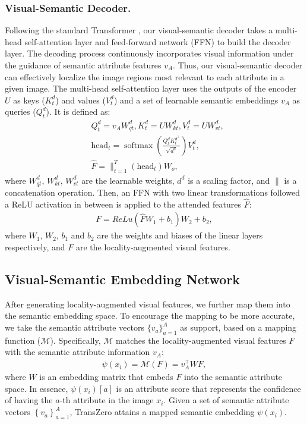 \documentclass[letterpaper]{article} %
\begin{document}
	\subsubsection{Visual-Semantic Decoder.}\label{sec3.2.2}
	Following the standard Transformer \cite{Vaswani2017AttentionIA}, our visual-semantic decoder takes a multi-head self-attention layer and feed-forward network (FFN) to build the decoder layer. The decoding process continuously incorporates visual information under the guidance of semantic attribute features $v_A$. Thus, our visual-semantic decoder can effectively localize the image regions most relevant to each attribute in a given image. The multi-head self-attention layer uses the outputs of the encoder $U$ as keys ($K_t^d$) and values ($V_t^d$) and a set of learnable semantic embeddings $v_A$ as queries ($Q_t^d$). It is defined as:
	\begin{align}
	\label{eq:decoder-atten}
	&Q_t^d=v_A W_{qt}^d, K_t^d=U W_{kt}^d, V_t^d=U W_{vt}^d, \\
	&\text{head}_{t}=\operatorname{softmax}\left(\frac{Q_t^d K_t^{d^{\top}}}{\sqrt{d^d}}\right) V_t^d,\\
	&\hat{F}= \|_{t=1}^{T} (\text{head}_{t})W_o,
	\end{align}
	where $W_{qt}^d$, $W_{kt}^d$, $W_{vt}^d$ are the learnable weights, $d^d$ is a scaling factor, and $\|$ is a concatenation operation. Then, an FFN with two linear transformations followed a ReLU activation in between is applied to the attended features $\hat{F}$:
	\begin{gather}
	\label{eq:FFN}
	F=ReLu \left(\hat{F} W_{1}+b_{1}\right) W_{2}+b_{2},
	\end{gather}
	where $W_{1}$, $W_{2}$, $b_1$ and $b_2$ are the weights and biases of the linear layers respectively, and $F$ are the locality-augmented visual features.
	
	\subsection{Visual-Semantic Embedding Network}\label{sec3.3}
	After generating locality-augmented visual features, we further map them into the semantic embedding space. To encourage the mapping to be more accurate, we take the semantic attribute vectors $\{v_{a}\}_{a=1}^A$ as support, based on a mapping function ($\mathcal{M}$). Specifically, $\mathcal{M}$ matches the locality-augmented visual features $F$ with the semantic attribute information $v_{A}$:
	\begin{gather}
	\label{Eq:vs_encoder}
	\psi(x_i)=\mathcal{M}(F)= v_{A}^{\top} W F,
	\end{gather}
	where $W$ is an embedding matrix that embeds $F$ into the semantic attribute space. In essence, $\psi(x_i)[a]$ is an attribute score that represents the confidence of having the $a$-th attribute in the image $x_i$. Given a set of semantic attribute vectors $\left\{v_{a}\right\}_{a=1}^{A}$, TransZero attains a mapped semantic embedding $\psi(x_i)$.
	
\end{document}
